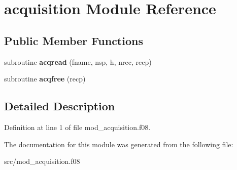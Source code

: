 \hypertarget{classacquisition}{\section{acquisition Module Reference}
\label{classacquisition}
}
\subsection*{Public Member Functions}
\begin{DoxyCompactItemize}
\item 
\hypertarget{classacquisition_abff2bd8495aee17883e7621fbb958a1e}{subroutine {\bfseries acqread} (fname, nsp, h, nrec, recp)}\label{classacquisition_abff2bd8495aee17883e7621fbb958a1e}

\item 
\hypertarget{classacquisition_a61da6c313372bd46cbcc45d57e52d283}{subroutine {\bfseries acqfree} (recp)}\label{classacquisition_a61da6c313372bd46cbcc45d57e52d283}

\end{DoxyCompactItemize}


\subsection{Detailed Description}


Definition at line 1 of file mod\-\_\-acquisition.\-f08.



The documentation for this module was generated from the following file\-:\begin{DoxyCompactItemize}
\item 
src/mod\-\_\-acquisition.\-f08\end{DoxyCompactItemize}
